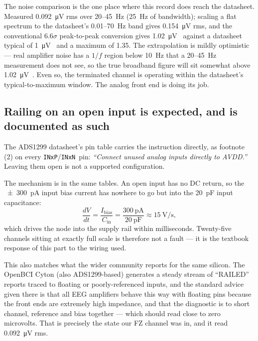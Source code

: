 \documentclass[11pt,a4paper]{article}
\begin{document}
The noise comparison is the one place where this record does reach the datasheet. Measured
\SI{0.092}{\micro\volt} rms over \SI{20}{}--\SI{45}{\hertz} (\SI{25}{\hertz} of bandwidth);
scaling a flat spectrum to the datasheet's \SI{0.01}{}--\SI{70}{\hertz} band gives
\SI{0.154}{\micro\volt} rms, and the conventional $6.6\sigma$ peak-to-peak conversion gives
\SI{1.02}{\micro\volt{}} against a datasheet typical of \SI{1}{\micro\volt{}} and a
maximum of \SI{1.35}{}. The extrapolation is mildly optimistic --- real amplifier noise has a
$1/f$ region below \SI{10}{\hertz} that a \SI{20}{}--\SI{45}{\hertz} measurement does not see,
so the true broadband figure will sit somewhat above \SI{1.02}{\micro\volt{}}. Even so, the
terminated channel is operating within the datasheet's typical-to-maximum window. The analog
front end is doing its job.

\subsection*{Railing on an open input is expected, and is documented as such}

The ADS1299 datasheet's pin table carries the instruction directly, as footnote (2) on every
\texttt{INxP}\slash\texttt{INxN}\ pin: \emph{``Connect unused analog inputs directly to AVDD.''}
Leaving them open is not a supported configuration.

The mechanism is in the same tables. An open input has no DC return, so the
\SI{\pm 300}{\pico\ampere} input bias current has nowhere to go but into the
\SI{20}{\pico\farad} input capacitance:
\[
\frac{dV}{dt} = \frac{I_{\text{bias}}}{C_{\text{in}}}
 = \frac{\SI{300}{\pico\ampere}}{\SI{20}{\pico\farad}} \approx \SI{15}{\volt\per\second},
\]
which drives the node into the supply rail within milliseconds. Twenty-five channels sitting at
exactly full scale is therefore not a fault --- it is the textbook response of this part to the
wiring used.

This also matches what the wider community reports for the same silicon. The OpenBCI Cyton
(also ADS1299-based) generates a steady stream of ``RAILED'' reports traced to floating or
poorly-referenced inputs, and the standard advice given there is that all EEG amplifiers behave
this way with floating pins because the front ends are extremely high impedance, and that the
diagnostic is to short channel, reference and bias together --- which should read close to zero
microvolts. That is precisely the state our FZ channel was in, and it read
\SI{0.092}{\micro\volt} rms.
\end{document}
